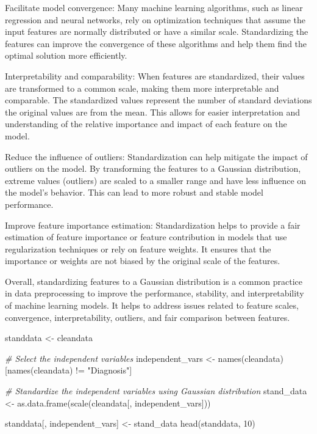 \documentclass[
]{article}
\newenvironment{Shaded}{\begin{snugshade}}{\end{snugshade}}
\newcommand{\CommentTok}[1]{\textcolor[rgb]{0.56,0.35,0.01}{\textit{#1}}}
\newcommand{\DecValTok}[1]{\textcolor[rgb]{0.00,0.00,0.81}{#1}}
\newcommand{\FunctionTok}[1]{\textcolor[rgb]{0.00,0.00,0.00}{#1}}
\newcommand{\NormalTok}[1]{#1}
\newcommand{\OtherTok}[1]{\textcolor[rgb]{0.56,0.35,0.01}{#1}}
\newcommand{\SpecialCharTok}[1]{\textcolor[rgb]{0.00,0.00,0.00}{#1}}
\newcommand{\StringTok}[1]{\textcolor[rgb]{0.31,0.60,0.02}{#1}}
\begin{document}
Facilitate model convergence: Many machine learning algorithms, such as
linear regression and neural networks, rely on optimization techniques
that assume the input features are normally distributed or have a
similar scale. Standardizing the features can improve the convergence of
these algorithms and help them find the optimal solution more
efficiently.

Interpretability and comparability: When features are standardized,
their values are transformed to a common scale, making them more
interpretable and comparable. The standardized values represent the
number of standard deviations the original values are from the mean.
This allows for easier interpretation and understanding of the relative
importance and impact of each feature on the model.

Reduce the influence of outliers: Standardization can help mitigate the
impact of outliers on the model. By transforming the features to a
Gaussian distribution, extreme values (outliers) are scaled to a smaller
range and have less influence on the model's behavior. This can lead to
more robust and stable model performance.

Improve feature importance estimation: Standardization helps to provide
a fair estimation of feature importance or feature contribution in
models that use regularization techniques or rely on feature weights. It
ensures that the importance or weights are not biased by the original
scale of the features.

Overall, standardizing features to a Gaussian distribution is a common
practice in data preprocessing to improve the performance, stability,
and interpretability of machine learning models. It helps to address
issues related to feature scales, convergence, interpretability,
outliers, and fair comparison between features.

\begin{Shaded}
\begin{Highlighting}[]
\NormalTok{standdata }\OtherTok{\textless{}{-}}\NormalTok{ cleandata}

\CommentTok{\# Select the independent variables}
\NormalTok{independent\_vars }\OtherTok{\textless{}{-}} \FunctionTok{names}\NormalTok{(cleandata)[}\FunctionTok{names}\NormalTok{(cleandata) }\SpecialCharTok{!=} \StringTok{"Diagnosis"}\NormalTok{]}

\CommentTok{\# Standardize the independent variables using Gaussian distribution}
\NormalTok{stand\_data }\OtherTok{\textless{}{-}} \FunctionTok{as.data.frame}\NormalTok{(}\FunctionTok{scale}\NormalTok{(cleandata[, independent\_vars]))}

\NormalTok{standdata[, independent\_vars] }\OtherTok{\textless{}{-}}\NormalTok{ stand\_data}
\FunctionTok{head}\NormalTok{(standdata, }\DecValTok{10}\NormalTok{)}
\end{Highlighting}
\end{Shaded}
\end{document}
